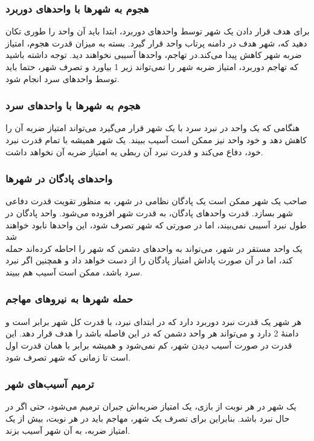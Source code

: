 \documentclass[]{article}
\begin{document}
\subsubsection*{{\titr هجوم به شهر‌ها با واحد‌های دوربرد}}
برای هدف قرار دادن یک شهر توسط واحد‌های دوربرد، ابتدا باید آن واحد را طوری تکان دهید که، شهر هدف در دامنه پرتاب واحد قرار گیرد. بسته به میزان قدرت هجوم، امتیاز ضربه شهر کاهش پیدا می‌کند.در تهاجم، واحد‌ها آسیبی نخواهند دید. توجه داشته باشید که تهاجم دوربرد، امتیاز ضربه شهر را نمی‌تواند زیر 1 بیاورد و تصرف شهر، حتما باید توسط واحد‌های سرد انجام شود.
\subsubsection*{{\titr هجوم به شهر‌ها با واحد‌های سرد}}
هنگامی که یک واحد در نبرد سرد با یک شهر قرار می‌گیرد می‌تواند امتیاز ضربه آن را کاهش دهد و خود واحد نیز ممکن است آسیب ببیند. یک شهر همیشه با تمام قدرت نبرد خود، دفاع می‌کند و قدرت نبرد آن ربطی یه امتیاز ضربه آن نخواهد داشت.
\subsubsection*{{\titr واحد‌های پادگان در شهر‌ها}}
صاحب یک شهر ممکن است یک پادگان نظامی در شهر، به منظور تقویت قدرت دفاعی شهر بسازد. قدرت واحد‌های پادگان، به قدرت شهر افزوده می‌شود. واحد پادگان در طول نبرد آسیبی نمی‌بیند، اما در صورتی که شهر تصرف شود، این واحد‌ها نابود خواهند شد\\
یک واحد مستقر در شهر، می‌تواند به واحد‌های دشمن که شهر را احاطه کرده‌اند حمله کند، اما در آن صورت پاداش امتیاز پادگان را از دست خواهد داد و همچنین اگر نبرد سرد باشد، ممکن است آسیب هم ببیند.
\subsubsection*{{\titr حمله شهر‌ها به نیرو‌های مهاجم}}
هر شهر یک قدرت نبرد دوربرد دارد که در ابتدای نبرد، با قدرت کل شهر برابر است و دامنۀ 2 دارد و می‌تواند هر واحد دشمن که در این فاصله باشد را هدف قرار دهد. این قدرت در صورت آسیب دیدن شهر، کم نمی‌شود و همیشه برابر با همان قدرت اول است تا زمانی که شهر تصرف شود.
\subsubsection*{{\titr ترمیم آسیب‌های شهر}}
یک شهر در هر نوبت از بازی، یک امتیاز ضربه‌اش جبران ترمیم می‌شود، حتی اگر در حال نبرد باشد. بنابراین برای تصرف یک شهر، مهاجم باید در هر نوبت، بیش از یک امتیاز ضربه، به آن شهر آسیب بزند.
\end{document}
